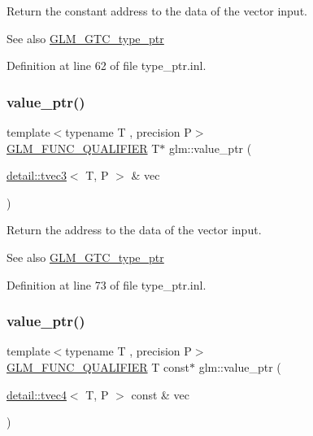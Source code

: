 Return the constant address to the data of the vector input. \begin{DoxySeeAlso}{See also}
\hyperlink{group__gtc__type__ptr}{G\+L\+M\+\_\+\+G\+T\+C\+\_\+type\+\_\+ptr} 
\end{DoxySeeAlso}


Definition at line 62 of file type\+\_\+ptr.\+inl.

\mbox{\label{group__gtc__type__ptr_ga4babc9956e32bbd0769bc20ab2d73800}} 
\subsubsection{\texorpdfstring{value\+\_\+ptr()}{value\_ptr()}\hspace{0.1cm}{\footnotesize\ttfamily [4/27]}}
{\footnotesize\ttfamily template$<$typename T , precision P$>$ \\
\hyperlink{setup_8hpp_a33fdea6f91c5f834105f7415e2a64407}{G\+L\+M\+\_\+\+F\+U\+N\+C\+\_\+\+Q\+U\+A\+L\+I\+F\+I\+ER} T$\ast$ glm\+::value\+\_\+ptr (\begin{DoxyParamCaption}\item[{\hyperlink{structglm_1_1detail_1_1tvec3}{detail\+::tvec3}$<$ T, P $>$ \&}]{vec }\end{DoxyParamCaption})}

Return the address to the data of the vector input. \begin{DoxySeeAlso}{See also}
\hyperlink{group__gtc__type__ptr}{G\+L\+M\+\_\+\+G\+T\+C\+\_\+type\+\_\+ptr} 
\end{DoxySeeAlso}


Definition at line 73 of file type\+\_\+ptr.\+inl.

\mbox{\label{group__gtc__type__ptr_ga6963deec2c77b8a49b3f7e434914f6ba}} 
\subsubsection{\texorpdfstring{value\+\_\+ptr()}{value\_ptr()}\hspace{0.1cm}{\footnotesize\ttfamily [5/27]}}
{\footnotesize\ttfamily template$<$typename T , precision P$>$ \\
\hyperlink{setup_8hpp_a33fdea6f91c5f834105f7415e2a64407}{G\+L\+M\+\_\+\+F\+U\+N\+C\+\_\+\+Q\+U\+A\+L\+I\+F\+I\+ER} T const$\ast$ glm\+::value\+\_\+ptr (\begin{DoxyParamCaption}\item[{\hyperlink{structglm_1_1detail_1_1tvec4}{detail\+::tvec4}$<$ T, P $>$ const \&}]{vec }\end{DoxyParamCaption})}

